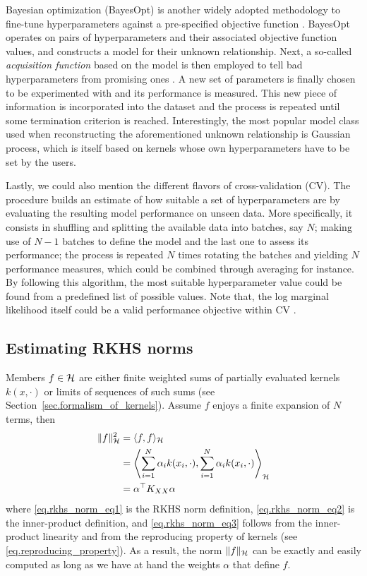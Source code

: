 Bayesian optimization (BayesOpt) is another widely adopted methodology to fine-tune hyperparameters against a pre-specified objective function \citep{snoek2012practical,shahriari2015taking}. BayesOpt operates on pairs of hyperparameters and their associated objective function values, and constructs a model for their unknown relationship. Next, a so-called \textit{acquisition function} based on the model is then employed to tell bad hyperparameters from promising ones \citep{wilson2018maximizing}. A new set of parameters is finally chosen to be experimented with and its performance is measured. This new piece of information is incorporated into the dataset and the process is repeated until some termination criterion is reached. Interestingly, the most popular model class used when reconstructing the aforementioned unknown relationship is Gaussian process, which is itself based on kernels whose own hyperparameters have to be set by the users.

Lastly, we could also mention the different flavors of cross-validation (CV). The procedure builds an estimate of how suitable a set of hyperparameters are by evaluating the resulting model performance on unseen data. More specifically, it consists in shuffling and splitting the available data into batches, say $N$; making use of $N-1$ batches to define the model and the last one to assess its performance; the process is repeated $N$ times rotating the batches and yielding $N$ performance measures, which could be combined through averaging for instance. By following this algorithm, the most suitable hyperparameter value could be found from a predefined list of possible values. Note that, the log marginal likelihood itself could be a valid performance objective within CV \citep[§5.4.2]{williams2006gaussian}.

\subsection{Estimating RKHS norms}
\label{sec.appendix_estimating_rkhs_norms}

Members $f \in \mathcal{H}$ are either finite weighted sums of partially evaluated kernels $k(x,\cdot)$ or limits of sequences of such sums (see Section~\ref{sec.formalism_of_kernels}). Assume $f$ enjoys a finite expansion of $N$ terms, then
\begin{align}
	\Vert f \Vert_{\mathcal{H}}^2 &= \langle f, f \rangle_{\mathcal{H}} \label{eq.rkhs_norm_eq1} \\
	&= \left\langle \sum_{i=1}^N \alpha_i k(x_i,\cdot), \sum_{i=1}^N \alpha_i k(x_i,\cdot) \right\rangle_{\mathcal{H}} \label{eq.rkhs_norm_eq2} \\
	&= \alpha^\top K_{XX} \alpha \label{eq.rkhs_norm_eq3}
\end{align}
where \eqref{eq.rkhs_norm_eq1} is the RKHS norm definition, \eqref{eq.rkhs_norm_eq2} is the inner-product definition, and \eqref{eq.rkhs_norm_eq3} follows from the inner-product linearity and from the reproducing property of kernels (see \eqref{eq.reproducing_property}). As a result, the norm $\Vert f \Vert_{\mathcal{H}}$ can be exactly and easily computed as long as we have at hand the weights $\alpha$ that define $f$.

